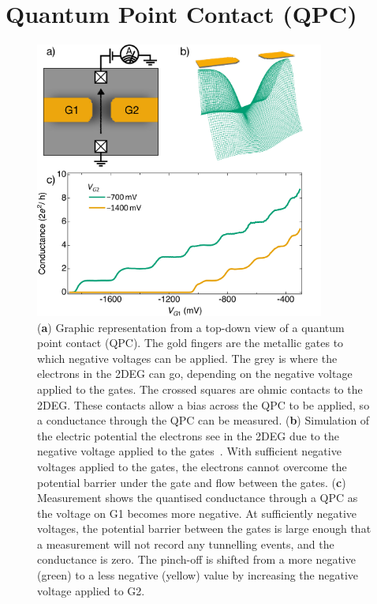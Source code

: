 \afterpage{\clearpage}
\section{Quantum Point Contact (QPC)}

\begin{figure}[!htb]
 \begin{center}
  \includegraphics[width=0.85\textwidth]{figures/ch1/figure3.pdf}
  \caption[Quantum Point Contact]{\label{fig:ch1/qpc_intro} 
  (\textbf{a}) Graphic representation from a top-down view of a quantum point contact (QPC). The gold fingers are the metallic gates to which negative voltages can be applied. The grey is where the electrons in the 2DEG can go, depending on the negative voltage applied to the gates. The crossed squares are ohmic contacts to the 2DEG. These contacts allow a bias across the QPC to be applied, so a conductance through the QPC can be measured. (\textbf{b}) Simulation of the electric potential the electrons see in the 2DEG due to the negative voltage applied to the gates~\cite{Davies1995}. With sufficient negative voltages applied to the gates, the electrons cannot overcome the potential barrier under the gate and flow between the gates. (\textbf{c}) Measurement shows the quantised conductance through a QPC as the voltage on G1 becomes more negative. At sufficiently negative voltages, the potential barrier between the gates is large enough that a measurement will not record any tunnelling events, and the conductance is zero. The pinch-off is shifted from a more negative (green) to a less negative (yellow) value by increasing the negative voltage applied to G2.
   }
 \end{center}
\end{figure}

